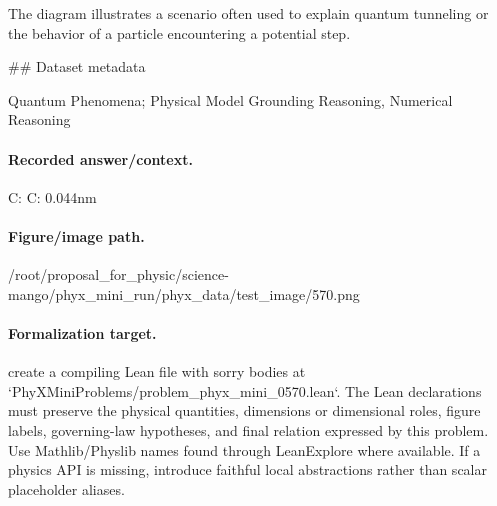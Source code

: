 The diagram illustrates a scenario often used to explain quantum tunneling or the behavior of a particle encountering a potential step.

\#\# Dataset metadata

Quantum Phenomena; Physical Model Grounding Reasoning, Numerical Reasoning

\paragraph{Recorded answer/context.}
C: C: 0.044nm

\paragraph{Figure/image path.}
/root/proposal\_for\_physic/science-mango/phyx\_mini\_run/phyx\_data/test\_image/570.png

\paragraph{Formalization target.}
create a compiling Lean file with sorry bodies at `PhyXMiniProblems/problem\_phyx\_mini\_0570.lean`. The Lean declarations must preserve the physical quantities, dimensions or dimensional roles, figure labels, governing-law hypotheses, and final relation expressed by this problem.
Use Mathlib/Physlib names found through LeanExplore where available. If a physics API is missing, introduce faithful local abstractions rather than scalar placeholder aliases.

